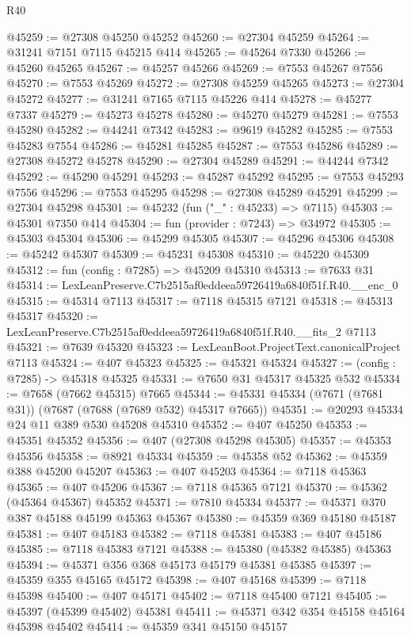 \begin{lexlean}{R40}
\begin{coremodule}
@45259 := @27308 @45250 @45252
@45260 := @27304 @45259
@45264 := @31241 @7151 @7115 @45215 @414
@45265 := @45264 @7330
@45266 := @45260 @45265
@45267 := @45257 @45266
@45269 := @7553 @45267 @7556
@45270 := @7553 @45269
@45272 := @27308 @45259 @45265
@45273 := @27304 @45272
@45277 := @31241 @7165 @7115 @45226 @414
@45278 := @45277 @7337
@45279 := @45273 @45278
@45280 := @45270 @45279
@45281 := @7553 @45280
@45282 := @44241 @7342
@45283 := @9619 @45282
@45285 := @7553 @45283 @7554
@45286 := @45281 @45285
@45287 := @7553 @45286
@45289 := @27308 @45272 @45278
@45290 := @27304 @45289
@45291 := @44244 @7342
@45292 := @45290 @45291
@45293 := @45287 @45292
@45295 := @7553 @45293 @7556
@45296 := @7553 @45295
@45298 := @27308 @45289 @45291
@45299 := @27304 @45298
@45301 := @45232 (fun ("_" : @45233) => @7115)
@45303 := @45301 @7350 @414
@45304 := fun (provider : @7243) => @34972
@45305 := @45303 @45304
@45306 := @45299 @45305
@45307 := @45296 @45306
@45308 := @45242 @45307
@45309 := @45231 @45308
@45310 := @45220 @45309
@45312 := fun (config : @7285) => @45209 @45310
@45313 := @7633 @31
@45314 := LexLeanPreserve.C7b2515af0eddeea59726419a6840f51f.R40.__enc_0
@45315 := @45314 @7113
@45317 := @7118 @45315 @7121
@45318 := @45313 @45317
@45320 := LexLeanPreserve.C7b2515af0eddeea59726419a6840f51f.R40.__fits_2 @7113
@45321 := @7639 @45320
@45323 := LexLeanBoot.ProjectText.canonicalProject @7113
@45324 := @407 @45323
@45325 := @45321 @45324
@45327 := (config : @7285) -> @45318 @45325
@45331 := @7650 @31 @45317 @45325 @532
@45334 := @7658 (@7662 @45315) @7665
@45344 := @45331 @45334 (@7671 (@7681 @31)) (@7687 (@7688 (@7689 @532) @45317 @7665))
@45351 := @20293 @45334 @24 @11 @389 @530 @45208 @45310
@45352 := @407 @45250
@45353 := @45351 @45352
@45356 := @407 (@27308 @45298 @45305)
@45357 := @45353 @45356
@45358 := @8921 @45334
@45359 := @45358 @52
@45362 := @45359 @388 @45200 @45207
@45363 := @407 @45203
@45364 := @7118 @45363
@45365 := @407 @45206
@45367 := @7118 @45365 @7121
@45370 := @45362 (@45364 @45367) @45352
@45371 := @7810 @45334
@45377 := @45371 @370 @387 @45188 @45199 @45363 @45367
@45380 := @45359 @369 @45180 @45187
@45381 := @407 @45183
@45382 := @7118 @45381
@45383 := @407 @45186
@45385 := @7118 @45383 @7121
@45388 := @45380 (@45382 @45385) @45363
@45394 := @45371 @356 @368 @45173 @45179 @45381 @45385
@45397 := @45359 @355 @45165 @45172
@45398 := @407 @45168
@45399 := @7118 @45398
@45400 := @407 @45171
@45402 := @7118 @45400 @7121
@45405 := @45397 (@45399 @45402) @45381
@45411 := @45371 @342 @354 @45158 @45164 @45398 @45402
@45414 := @45359 @341 @45150 @45157

\end{coremodule}
\end{lexlean}
